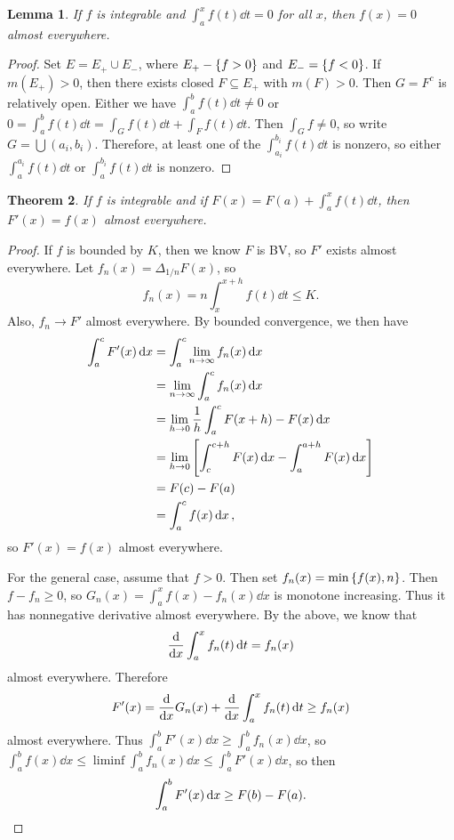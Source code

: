 \documentclass[leqno, openany]{memoir}
\newtheorem{thm}{Theorem}[chapter]
\newtheorem{lem}[thm]{Lemma}
\theoremstyle{definition}
\theoremstyle{remark}
\theoremstyle{plain}
\theoremstyle{definition}
\theoremstyle{remark}
\begin{document}
\begin{lem} If $f$ is integrable and $\int_a^x f(t) \dd{t} = 0$ for all $x$,
then $f(x) = 0$ almost everywhere.  \end{lem}

\begin{proof} Set $E = E_+ \cup E_-$, where $E_+ - \qty{f > 0}$ and $E_- =
    \qty{f < 0}$. If $m(E_+) > 0$, then there exists closed $F \subseteq E_+$
    with $m(F) > 0$. Then $G = F^c$ is relatively open. Either we have
    $\int_a^b f(t) \dd{t} \neq 0$ or $0 = \int_a^b f(t) \dd{t} = \int_G f(t)
    \dd{t} + \int_F f(t) \dd{t}$. Then $\int_G f \neq 0$, so write $G = \bigcup
    (a_i,b_i)$. Therefore, at least one of the $\int_{a_i}^{b_i} f(t) \dd{t}$
    is nonzero, so either $\int_a^{a_i} f(t) \dd{t}$ or $\int_a^{b_i} f(t)
    \dd{t}$ is nonzero.  \end{proof}

\begin{thm} If $f$ is integrable and if $F(x) = F(a) + \int_a^x f(t) \dd{t}$,
then $F'(x) = f(x)$ almost everywhere.  \end{thm}

\begin{proof} If $f$ is bounded by $K$, then we know $F$ is BV, so $F'$ exists
    almost everywhere. Let $f_n(x) = \Delta_{1/n} F(x)$, so \[ f_n(x) = n
    \int_x^{x+h} f(t) \dd{t} \leq K. \] Also, $f_n \to F'$ almost everywhere.
    By bounded convergence, we then have \begin{align*} \int_a^c F'(x) \dd{x}
    &= \int_a^c \lim_{n \to \infty} f_n(x) \dd{x} \\ &= \lim_{n \to \infty}
        \int_a^c f_n(x) \dd{x} \\ &= \lim_{h \to 0} \frac{1}{h} \int_a^c F(x+h)
        - F(x) \dd{x} \\ &= \lim_{h \to 0} \qty[\int_c^{c+h} F(x) \dd{x} -
    \int_a^{a+h} F(x) \dd{x}] \\ &= F(c) - F(a) \\ &= \int_a^c f(x) \dd{x},
\end{align*} so $F'(x) = f(x)$ almost everywhere.

    For the general case, assume that $f > 0$. Then set $f_n(x) =
    \min\qty{f(x),n}$. Then $f - f_n \geq 0$, so $G_n(x) = \int_a^x f(x) -
    f_n(x) \dd{x}$ is monotone increasing. Thus it has nonnegative derivative
    almost everywhere. By the above, we know that \[ \dv{x} \int_a^x f_n(t)
    \dd{t} = f_n(x) \] almost everywhere. Therefore \[ F'(x) = \dv{x} G_n(x) +
\dv{x} \int_a^x f_n(t) \dd{t} \geq f_n(x) \] almost everywhere. Thus $\int_a^b
F'(x) \dd{x} \geq \int_a^b f_n(x) \dd{x}$, so $\int_a^b f(x) \dd{x} \leq
\liminf \int_a^b f_n(x) \dd{x} \leq \int_{a}^b F'(x) \dd{x}$, so then \[
\int_a^b F'(x) \dd{x} \geq F(b) - F(a). \qedhere \] \end{proof}
\end{document}

